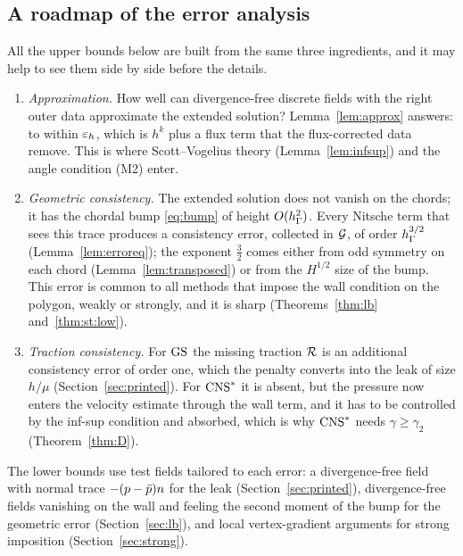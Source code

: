 \subsection{A roadmap of the error analysis}
All the upper bounds below are built from the same three ingredients, and it may help to see them side by side before the details.
\begin{enumerate}[label=(\roman*)]
\item \emph{Approximation.} How well can divergence-free discrete fields with the right outer data approximate the extended solution? Lemma~\ref{lem:approx} answers: to within $\varepsilon_h$, which is $h^k$ plus a flux term that the flux-corrected data remove. This is where Scott--Vogelius theory (Lemma~\ref{lem:infsup}) and the angle condition (M2) enter.
\item \emph{Geometric consistency.} The extended solution does not vanish on the chords; it has the chordal bump \eqref{eq:bump} of height $O(h_\Gamma^2)$. Every Nitsche term that sees this trace produces a consistency error, collected in $\mathcal G$, of order $h_\Gamma^{3/2}$ (Lemma~\ref{lem:erroreq}); the exponent $\frac32$ comes either from odd symmetry on each chord (Lemma~\ref{lem:transposed}) or from the $H^{1/2}$ size of the bump. This error is common to all methods that impose the wall condition on the polygon, weakly or strongly, and it is sharp (Theorems~\ref{thm:lb} and~\ref{thm:st:low}).
\item \emph{Traction consistency.} For $\mathrm{GS}$ the missing traction $\mathcal R$ is an additional consistency error of order one, which the penalty converts into the leak of size $h/\mu$ (Section~\ref{sec:printed}). For $\mathrm{CNS}^\ast$ it is absent, but the pressure now enters the velocity estimate through the wall term, and it has to be controlled by the inf-sup condition and absorbed, which is why $\mathrm{CNS}^\ast$ needs $\gamma\ge\gamma_2$ (Theorem~\ref{thm:D}).
\end{enumerate}
The lower bounds use test fields tailored to each error: a divergence-free field with normal trace $-(p-\bar p)n$ for the leak (Section~\ref{sec:printed}), divergence-free fields vanishing on the wall and feeling the second moment of the bump for the geometric error (Section~\ref{sec:lb}), and local vertex-gradient arguments for strong imposition (Section~\ref{sec:strong}).
